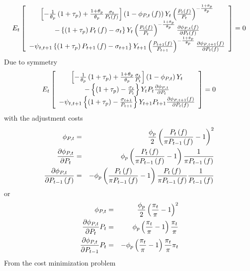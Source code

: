 \documentclass{article}
\begin{document}
\[
E_{t}\left[ 
\begin{array}{c}
\left[ -\frac{1}{\theta _{p}}\left( 1+\tau _{p}\right) +\frac{1+\theta _{p}}{%
\theta _{p}}\frac{\sigma _{t}}{P_{t}\left( f\right) }\right] \left( 1-\phi
_{P,t}\left( f\right) \right) Y_{t}\left( \frac{P_{t}\left( f\right) }{P_{t}}%
\right) ^{-\frac{1+\theta _{p}}{\theta _{p}}} \\ 
-\left\{ \left( 1+\tau _{p}\right) P_{t}\left( f\right) -\sigma _{t}\right\}
Y_{t}\left( \frac{P_{t}\left( f\right) }{P_{t}}\right) ^{-\frac{1+\theta _{p}%
}{\theta _{p}}}\frac{\partial \phi _{P,t}\left( f\right) }{\partial
P_{t}\left( f\right) } \\ 
-\psi _{t,t+1}\left\{ \left( 1+\tau _{p}\right) P_{t+1}\left( f\right)
-\sigma _{t+1}\right\} Y_{t+1}\left( \frac{P_{t+1}\left( f\right) }{P_{t+1}}%
\right) ^{-\frac{1+\theta _{p}}{\theta _{p}}}\frac{\partial \phi
_{P,t+1}\left( f\right) }{\partial P_{t}\left( f\right) }%
\end{array}%
\right] =0 
\]%
Due to symmetry%
\[
E_{t}\left[ 
\begin{array}{c}
\left[ -\frac{1}{\theta _{p}}\left( 1+\tau _{p}\right) +\frac{1+\theta _{p}}{%
\theta _{p}}\frac{\sigma _{t}}{P_{t}}\right] \left( 1-\phi _{P,t}\right)
Y_{t} \\ 
-\left\{ \left( 1+\tau _{p}\right) -\frac{\sigma _{t}}{P_{t}}\right\}
Y_{t}P_{t}\frac{\partial \phi _{P,t}}{\partial P_{t}} \\ 
-\psi _{t,t+1}\left\{ \left( 1+\tau _{p}\right) -\frac{\sigma _{t+1}}{P_{t+1}%
}\right\} Y_{t+1}P_{t+1}\frac{\partial \phi _{P,t+1}\left( f\right) }{%
\partial P_{t}\left( f\right) }%
\end{array}%
\right] =0 
\]%
with the adjustment costs%
\begin{eqnarray*}
\phi _{P,t} &=&\frac{\phi _{p}}{2}\left( \frac{P_{t}\left( f\right) }{\pi
P_{t-1}\left( f\right) }-1\right) ^{2} \\
\frac{\partial \phi _{P,t}}{\partial P_{t}} &=&\phi _{p}\left( \frac{%
P_{t}\left( f\right) }{\pi P_{t-1}\left( f\right) }-1\right) \frac{1}{\pi
P_{t-1}\left( f\right) } \\
\frac{\partial \phi _{P,t}}{\partial P_{t-1}\left( f\right) } &=&-\phi
_{p}\left( \frac{P_{t}\left( f\right) }{\pi P_{t-1}\left( f\right) }%
-1\right) \frac{P_{t}\left( f\right) }{\pi P_{t-1}\left( f\right) }\frac{1}{%
P_{t-1}\left( f\right) }
\end{eqnarray*}%
or%
\begin{eqnarray*}
\phi _{P,t} &=&\frac{\phi _{p}}{2}\left( \frac{\pi _{t}}{\pi }-1\right) ^{2}
\\
\frac{\partial \phi _{P,t}}{\partial P_{t}}P_{t} &=&\phi _{p}\left( \frac{%
\pi _{t}}{\pi }-1\right) \frac{\pi _{t}}{\pi } \\
\frac{\partial \phi _{P,t}}{\partial P_{t-1}}P_{t} &=&-\phi _{p}\left( \frac{%
\pi _{t}}{\pi }-1\right) \frac{\pi _{t}}{\pi }\pi _{t}
\end{eqnarray*}%
From the cost minimization problem
\end{document}
